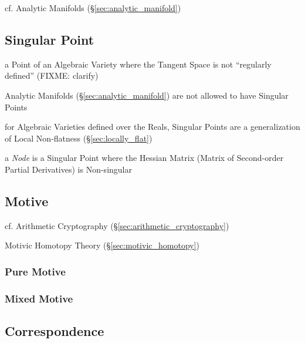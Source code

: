 cf. Analytic Manifolds (\S\ref{sec:analytic_manifold})



\subsection{Singular Point}\label{sec:singular_point}

a Point of an Algebraic Variety where the Tangent Space is not ``regularly
defined'' (FIXME: clarify)

Analytic Manifolds (\S\ref{sec:analytic_manifold}) are not allowed to have
Singular Points

for Algebraic Varieties defined over the Reals, Singular Points are a
generalization of Local Non-flatness (\S\ref{sec:locally_flat})

a \emph{Node} is a Singular Point where the Hessian Matrix (Matrix of
Second-order Partial Derivatives) is Non-singular



\subsection{Motive}\label{sec:motive}

cf. Arithmetic Cryptography (\S\ref{sec:arithmetic_cryptography})

Motivic Homotopy Theory (\S\ref{sec:motivic_homotopy})



\subsubsection{Pure Motive}\label{sec:pure_motive}

\subsubsection{Mixed Motive}\label{sec:mixed_motive}



\subsection{Correspondence}\label{sec:variety_correspondence}

